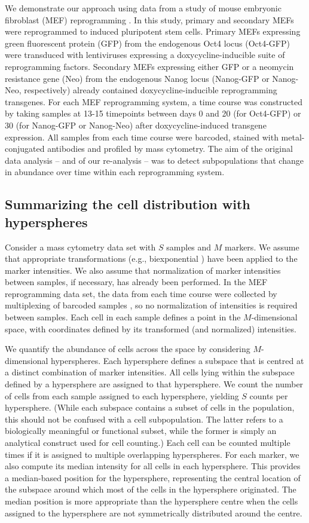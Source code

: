 \documentclass{article}
\begin{document}
We demonstrate our approach using data from a study of mouse embryonic fibroblast (MEF) reprogramming \cite{zunder2015continuous}.
In this study, primary and secondary MEFs were reprogrammed to induced pluripotent stem cells.
Primary MEFs expressing green fluorescent protein (GFP) from the endogenous Oct4 locus (Oct4-GFP) were transduced with lentiviruses expressing a doxycycline-inducible suite of reprogramming factors.
Secondary MEFs expressing either GFP or a neomycin resistance gene (Neo) from the endogenous Nanog locus (Nanog-GFP or Nanog-Neo, respectively) already contained doxycycline-inducible reprogramming transgenes.
For each MEF reprogramming system, a time course was constructed by taking samples at 13-15 timepoints between days 0 and 20 (for Oct4-GFP) or 30 (for Nanog-GFP or Nanog-Neo) after doxycycline-induced transgene expression.
All samples from each time course were barcoded, stained with metal-conjugated antibodies and profiled by mass cytometry.
The aim of the original data analysis -- and of our re-analysis -- was to detect subpopulations that change in abundance over time within each reprogramming system.

\subsection{Summarizing the cell distribution with hyperspheres}
Consider a mass cytometry data set with $S$ samples and $M$ markers.
We assume that appropriate transformations (e.g., biexponential \cite{parks2006new}) have been applied to the marker intensities.
We also assume that normalization of marker intensities between samples, if necessary, has already been performed.
In the MEF reprogramming data set, the data from each time course were collected by multiplexing of barcoded samples \cite{zunder2015palladium}, so no normalization of intensities is required between samples.
Each cell in each sample defines a point in the $M$-dimensional space, with coordinates defined by its transformed (and normalized) intensities.

We quantify the abundance of cells across the space by considering $M$-dimensional hyperspheres.
Each hypersphere defines a subspace that is centred at a distinct combination of marker intensities.
All cells lying within the subspace defined by a hypersphere are assigned to that hypersphere.
We count the number of cells from each sample assigned to each hypersphere, yielding $S$ counts per hypersphere.
(While each subspace contains a subset of cells in the population, this should not be confused with a cell subpopulation.
The latter refers to a biologically meaningful or functional subset, while the former is simply an analytical construct used for cell counting.)
Each cell can be counted multiple times if it is assigned to multiple overlapping hyperspheres.
For each marker, we also compute its median intensity for all cells in each hypersphere.
This provides a median-based position for the hypersphere, representing the central location of the subspace around which most of the cells in the hypersphere originated.
The median position is more appropriate than the hypersphere centre when the cells assigned to the hypersphere are not symmetrically distributed around the centre.
\end{document}

